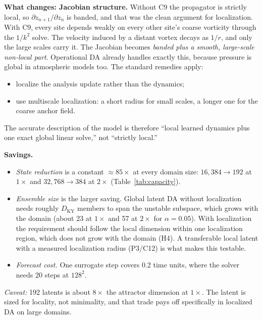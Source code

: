 \documentclass[11pt]{article}
\begin{document}
\textbf{What changes: Jacobian structure.} Without C9 the propagator is
strictly local, so $\partial z_{n+1}/\partial z_n$ is banded, and that
was the clean argument for localization. With C9, every site depends
weakly on every other site's coarse vorticity through the $1/k^2$ solve.
The velocity induced by a distant vortex decays as $1/r$, and only the
large scales carry it. The Jacobian becomes \emph{banded plus a smooth,
large-scale non-local part}. Operational DA already handles exactly this,
because pressure is global in atmospheric models too. The standard
remedies apply:
\begin{itemize}[leftmargin=*]
\item localize the analysis update rather than the dynamics;
\item use multiscale localization: a short radius for small scales, a
  longer one for the coarse anchor field.
\end{itemize}
The accurate description of the model is therefore ``local learned
dynamics plus one exact global linear solve,'' not ``strictly local.''

\textbf{Savings.}
\begin{itemize}[leftmargin=*]
\item \emph{State reduction} is a constant $\approx85\times$ at every
  domain size: $16{,}384\to192$ at $1\times$ and $32{,}768\to384$ at
  $2\times$ (Table~\ref{tab:capacity}).
\item \emph{Ensemble size} is the larger saving. Global latent DA without
  localization needs roughly $D_{\mathrm{KY}}$ members to span the
  unstable subspace, which grows with the domain (about 23 at $1\times$
  and 57 at $2\times$ for $\alpha{=}0.05$). With localization the
  requirement should follow the local dimension within one localization
  region, which does not grow with the domain (H4). A transferable local
  latent with a measured localization radius (P3/C12) is what makes this
  testable.
\item \emph{Forecast cost.} One surrogate step covers 0.2 time units,
  where the solver needs 20 steps at $128^2$.
\end{itemize}
\emph{Caveat:} 192 latents is about $8\times$ the attractor dimension at
$1\times$. The latent is sized for locality, not minimality, and that
trade pays off specifically in localized DA on large domains.
\end{document}
